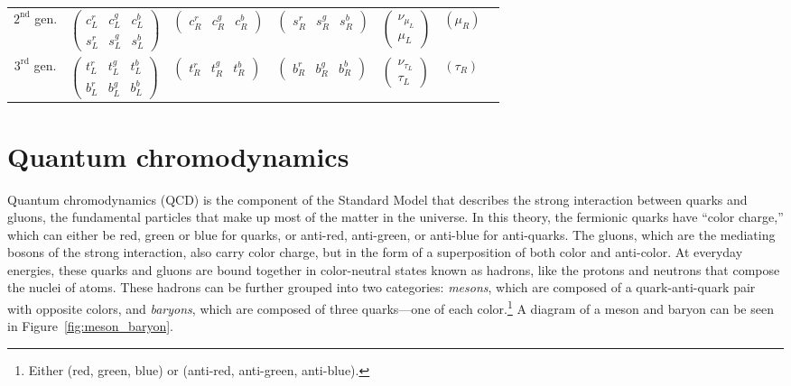 \begin{table}
{\begin{tabular}{c|llllll}
$2^{\text{nd}}$ gen. & $\left(\begin{array}{lllll}c_L^r & c_L^g & c_L^b \\
s_L^r & s_L^g & s_L^b\end{array}\right)$ & $\left(\begin{array}{llll}c_R^r & c_R^g & c_R^b\end{array}\right)$ & $\left(\begin{array}{llll}s_R^r & s_R^g & s_R^b\end{array}\right)$ & $\left(\begin{array}{c}\nu_{\mu_L} \\
\mu_L\end{array}\right)$ & $\left(\mu_R\right)$ \\
$3^{\text{rd}}$ gen. & $\left(\begin{array}{llll}t_L^r & t_L^g & t_L^b \\
b_L^r & b_L^g & b_L^b\end{array}\right)$ & $\left(\begin{array}{llll}t_R^r & t_R^g & t_R^b\end{array}\right)$ & $\left(\begin{array}{lll}b_R^r & b_R^g & b_R^b\end{array}\right)$ & $\left(\begin{array}{c}\nu_{\tau_L} \\
\tau_L\end{array}\right)$ & $\left(\tau_R\right)$

\end{tabular}}
\label{tab:fermions}
\end{table}

\clearpage

\section{Quantum chromodynamics}
\label{sec:qcd}

Quantum chromodynamics (QCD) is the component of the Standard Model that describes the strong interaction between quarks and gluons, the fundamental particles that make up most of the matter in the universe. In this theory, the fermionic quarks have ``color charge,'' which can either be red, green or blue for quarks, or anti-red, anti-green, or anti-blue for anti-quarks. The gluons, which are the mediating bosons of the strong interaction, also carry color charge, but in the form of a superposition of both color and anti-color. At everyday energies, these quarks and gluons are bound together in color-neutral states known as hadrons, like the protons and neutrons that compose the nuclei of atoms. These hadrons can be further grouped into two categories: \textit{mesons}, which are composed of a quark-anti-quark pair with opposite colors, and \textit{baryons}, which are composed of three quarks---one of each color.\footnote{Either (red, green, blue) or (anti-red, anti-green, anti-blue).} A diagram of a meson and baryon can be seen in Figure~\ref{fig:meson_baryon}.

